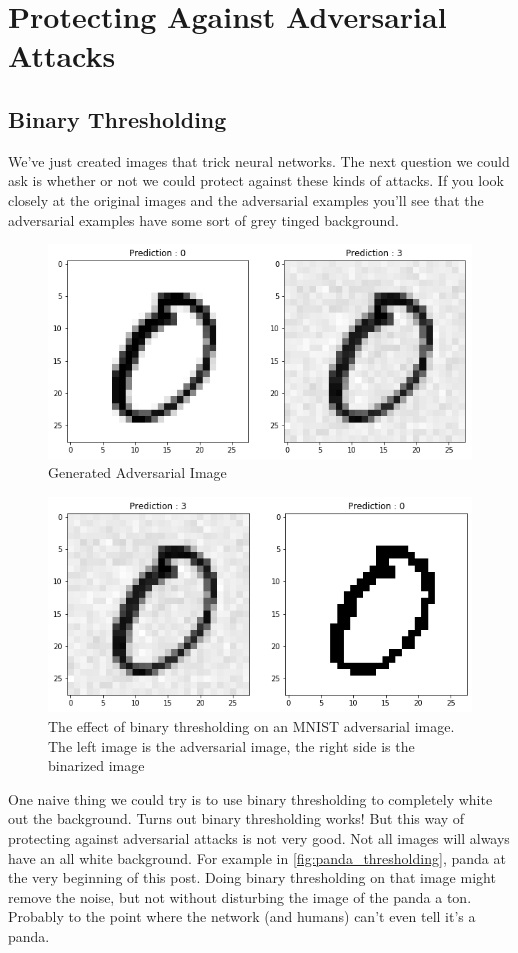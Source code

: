 \section{Protecting Against Adversarial Attacks}

    \subsection{Binary Thresholding}

        We’ve just created images that trick neural networks. The next question we could ask is whether or not we could protect against these kinds of attacks. If you look closely at the original images and the adversarial examples you’ll see that the adversarial examples have some sort of grey tinged background.

        \begin{figure}[htbp]
            \centering
            \includegraphics[width=0.7\linewidth]{images/adversarial1.png}
            \caption{Generated Adversarial Image}
        \end{figure}

        \begin{figure}[htbp]
            \centering
            \includegraphics[width=0.7\linewidth]{images/thresholding.png}
            \caption{The effect of binary thresholding on an MNIST adversarial image. The left image is the adversarial image, the right side is the binarized image}
        \end{figure}

        One naive thing we could try is to use binary thresholding to completely white out the background. Turns out binary thresholding works! But this way of protecting against adversarial attacks is not very good. Not all images will always have an all white background. For example in \cref{fig:panda_thresholding},	 panda at the very beginning of this post. Doing binary thresholding on that image might remove the noise, but not without disturbing the image of the panda a ton. Probably to the point where the network (and humans) can’t even tell it’s a panda.
                
